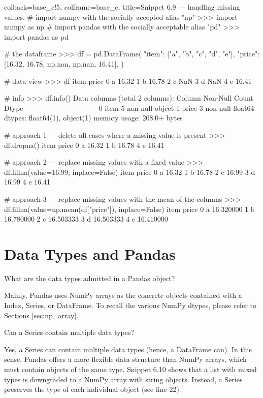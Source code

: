 \documentclass[a4paper,11pt]{book}
\numberwithin{figure}{chapter}
\numberwithin{table}{chapter}
\newcommand{\question}[1]{%
    \begin{tcolorbox}[colback=comp_c!10,colframe=comp_c,sidebyside align=top,width=\linewidth,before skip=1ex]
        #1
    \end{tcolorbox}
    \switchcolumn%
}
\newcommand{\note}[1]{%
    \begin{tcolorbox}[colback=white!0,colframe=white!10,width=\linewidth,before skip=1ex]
        #1
    \end{tcolorbox}
}
\begin{document}
\begin{pythoncode}[linenos=True]{colback=base_c!5, colframe=base_c, title=\sffamily Snippet 6.9 --- handling missing values}.
# import numpy with the socially accepted alias "np"
>>> import numpy as np
# import pandas with the socially acceptable alias "pd"
>>> import pandas as pd 

# the dataframe
>>> df = pd.DataFrame(
	{
	    "item": ["a", "b", "c", "d", "e"],
	    "price": [16.32, 16.78, np.nan, np.nan, 16.41],
	}
)

# data view 
>>> df
  item  price
0    a  16.32
1    b  16.78
2    c    NaN
3    d    NaN
4    e  16.41

# info 
>>> df.info()
Data columns (total 2 columns):
     Column  Non-Null Count  Dtype  
---  ------  --------------  -----  
 0   item    5 non-null      object 
 1   price   3 non-null      float64
dtypes: float64(1), object(1)
memory usage: 208.0+ bytes

# approach 1 --- delete all cases where a missing value is present
>>> df.dropna()
  item  price
0    a  16.32
1    b  16.78
4    e  16.41

# approach 2 --- replace missing values with a fixed value
>>> df.fillna(value=16.99, inplace=False)
  item  price
0    a  16.32
1    b  16.78
2    c  16.99
3    d  16.99
4    e  16.41

# approach 3 --- replace missing values with the mean of the columns
>>> df.fillna(value=np.mean(df["price"]), inplace=False)
  item      price
0    a  16.320000
1    b  16.780000
2    c  16.503333
3    d  16.503333
4    e  16.410000
\end{pythoncode}
\clearpage
\section{Data Types and Pandas} 

\begin{paracol}{2}
	\question{\raggedright What are the data types admitted in a Pandas object?}
	\note{Mainly, Pandas uses NumPy arrays as the concrete objects contained with a Index, Series, or DataFrame. To recall the various NumPy dtypes, please refer to Sections \ref{sec:np_array}.}
\end{paracol}

\begin{paracol}{2}
	\question{\raggedright Can a Series contain multiple data types?}
	\note{Yes, a Series can contain multiple data types (hence, a DataFrame can). In this sense, Pandas offers a more flexible data structure than NumPy arrays, which must contain objects of the same type. Snippet 6.10 shows that a list with mixed types is downgraded to a NumPy array with string objects. Instead, a Series preserves the type of each individual object (see line 22).}
\end{paracol}
\end{document}
